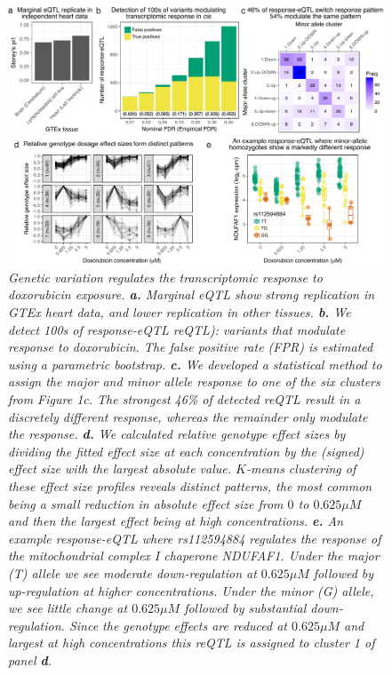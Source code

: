 \documentclass{article}
\begin{document}
{\begin{figure}
\begin{center}
    \includegraphics[width=1\textwidth]{../figures/fig2.pdf}     \caption{\it{Genetic variation regulates the transcriptomic response to doxorubicin exposure. \textbf{a.} Marginal eQTL show strong replication in GTEx heart data, and lower replication in other tissues. \textbf{b.} We detect 100s of response-eQTL reQTL): variants that modulate response to doxorubicin. The false positive rate (FPR) is estimated using a parametric bootstrap. \textbf{c.} We developed a statistical method to assign the major and minor allele response to one of the six clusters from Figure 1c. The strongest 46\% of detected reQTL result in a discretely different response, whereas the remainder only modulate the response. \textbf{d.} We calculated relative genotype effect sizes by dividing the fitted effect size at each concentration by the (signed) effect size with the largest absolute value. $K$-means clustering of these effect size profiles reveals distinct patterns, the most common being a small reduction in absolute effect size from $0$ to $0.625\mu M$ and then the largest effect being at high concentrations. \textbf{e.} An example response-eQTL where rs112594884 regulates the response of the mitochondrial complex I chaperone NDUFAF1. Under the major (T) allele we see moderate down-regulation at $0.625\mu M$ followed by up-regulation at higher concentrations. Under the minor (G) allele, we see little change at $0.625\mu M$ followed by substantial down-regulation. Since the genotype effects are reduced at $0.625\mu M$ and largest at high concentrations this reQTL is assigned to cluster 1 of panel \textbf{d}.}}
    \label{fig2}
    \end{center}
\end{figure}

}
\end{document}
